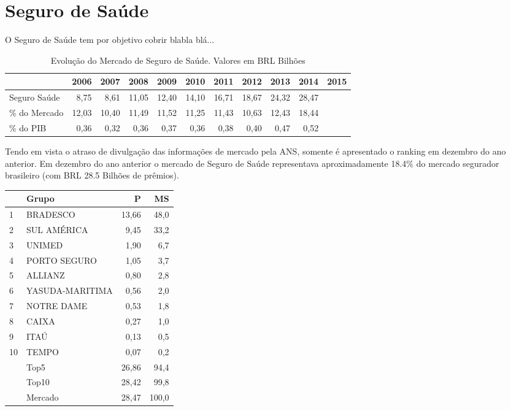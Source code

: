 \documentclass[../../relatorio.tex]{subfiles}
\begin{document}
\section{Seguro de Saúde}

O Seguro de Saúde tem por objetivo cobrir blabla blá...


\begin{table}[ht]
\centering
\begin{tabular}{lrrrrrrrrrr}
  \hline
 & 2006 & 2007 & 2008 & 2009 & 2010 & 2011 & 2012 & 2013 & 2014 & 2015 \\ 
  \hline
\hline
Seguro Saúde & 8,75 & 8,61 & 11,05 & 12,40 & 14,10 & 16,71 & 18,67 & 24,32 & 28,47 &  \\ 
   \hline
\% do Mercado & 12,03 & 10,40 & 11,49 & 11,52 & 11,25 & 11,43 & 10,63 & 12,43 & 18,44 &  \\ 
   \hline
\% do PIB & 0,36 & 0,32 & 0,36 & 0,37 & 0,36 & 0,38 & 0,40 & 0,47 & 0,52 &  \\ 
   \hline
\end{tabular}
\caption{Evolução do Mercado de Seguro de Saúde. Valores em BRL Bilhões} 
\end{table}
Tendo em vista o atraso de divulgação das informações de mercado pela ANS, somente é apresentado o ranking em dezembro do ano anterior. Em dezembro do ano anterior o mercado de Seguro de Saúde representava aproximadamente 18.4\% do mercado segurador brasileiro (com BRL 28.5 Bilhões de prêmios).\\


\begin{table}[!h]
  \begin{minipage}[t]{0.49\linewidth}
    \centering
\begin{tabular}{llrr}
  \hline
 & Grupo & P & MS \\ 
  \hline
1 & BRADESCO & 13,66 & 48,0 \\ 
  2 & SUL AMÉRICA & 9,45 & 33,2 \\ 
  3 & UNIMED & 1,90 & 6,7 \\ 
  4 & PORTO SEGURO & 1,05 & 3,7 \\ 
  5 & ALLIANZ & 0,80 & 2,8 \\ 
  6 & YASUDA-MARITIMA & 0,56 & 2,0 \\ 
  7 & NOTRE DAME & 0,53 & 1,8 \\ 
  8 & CAIXA & 0,27 & 1,0 \\ 
  9 & ITAÚ & 0,13 & 0,5 \\ 
  10 & TEMPO & 0,07 & 0,2 \\ 
   \hline
 & Top5 & 26,86 & 94,4 \\ 
   & Top10 & 28,42 & 99,8 \\ 
   & Mercado & 28,47 & 100,0 \\ 
   \hline
\end{tabular}    
  \end{minipage}
\end{table}

\pagebreak
\end{document}

